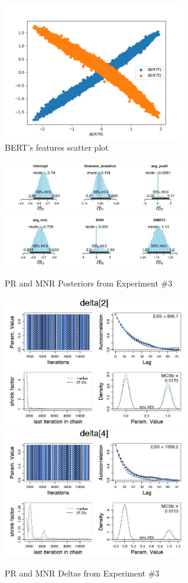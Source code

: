 \documentclass[man, floatsintext, 10pt]{apa6}
\begin{document}
\begin{figure}
\includegraphics[width=8cm]{BERTFeaturesScatterPlot.png}
\caption{BERT's features scatter plot}
  \label{BERTf}
\end{figure}

\begin{figure}
\includegraphics[width=8cm]{posteriors_bdata_02.jpg}
\includegraphics[width=8cm]{pposteriors_bdata_02.jpg}
\caption{PR and MNR Posteriors from Experiment \#3}
  \label{PR_MNR_Posteriors}
\end{figure}

\begin{figure}
\includegraphics[width=8cm]{delta_PR_bdata_02.jpg}
\includegraphics[width=8cm]{delta_MNR_bdata_02.jpg}
\caption{PR and MNR Deltas from Experiment \#3}
  \label{PR_MNR_Deltas}
\end{figure}
\end{document}
